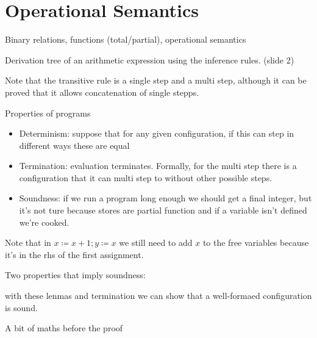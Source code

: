 % 
\chapter{Operational Semantics}

Binary relations, functions (total/partial), operational semantics

Derivation tree of an arithmetic expression using the inference rules. (slide 2)


Note that the transitive rule is a single step and a multi step, although it can be proved that it allows concatenation of single stepps.

Properties of programs
\begin{itemize}
\item Determinism: suppose that for any given configuration, if this can step in different ways these are equal
  \item Termination: evaluation terminates. Formally, for the multi step there is a configuration that it can multi step to without other possible steps.
    \item Soundness: if we run a program long enough we should get a final integer, but it's not ture because stores are partial function and if a variable isn't defined we're cooked.
\end{itemize}


Note that in $ x \coloneq x + 1; y \coloneq x $ we still need to add $ x $ to the free variables because it's in the rhs of the first assignment. 


Two properties that imply soundness:



with these lenmas and termination we can show that a well-formaed configuration is sound.

A bit of maths before the proof

